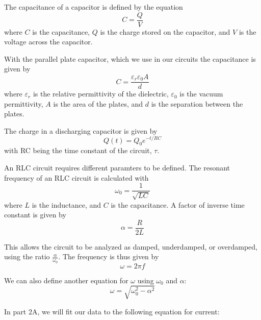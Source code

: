 \documentclass[11pt]{article}
\begin{document}
    The capacitance of a capacitor is defined by the equation
    \begin{equation}
        C = \frac{Q}{V}
    \end{equation}\label{eq:capacitance}
    where $C$ is the capacitance, $Q$ is the charge stored on the capacitor, and $V$ is the voltage across the capacitor.

    With the parallel plate capacitor, which we use in our circuits the capacitance is given by
    \begin{equation}
        C = \frac{\varepsilon_r \varepsilon_0 A}{d}
    \end{equation}\label{eq:parallel-plate-capacitance}
    where $\varepsilon_r$ is the relative permittivity of the dielectric, $\varepsilon_0$ is the vacuum permittivity, $A$ is the area of the plates, and $d$ is the separation between the plates.

    The charge in a discharging capacitor is given by
    \begin{equation}
        Q(t) = Q_0 e^{-t/RC}
    \end{equation}\label{eq:discharging-capacitor}
    with RC being the time constant of the circuit, $\tau$.

    An RLC circuit requires different paramters to be defined.
    The resonant frequency of an RLC circuit is calculated with
    \begin{equation}
        \omega_0 = \frac{1}{\sqrt{LC}}
    \end{equation}\label{eq:omega-0}
    where $L$ is the inductance, and $C$ is the capacitance.
    A factor of inverse time constant is given by
    \begin{equation}
        \alpha = \frac{R}{2L}
    \end{equation}\label{eq:alpha}

    This allows the circuit to be analyzed as damped, underdamped, or overdamped, using the ratio $\frac{\alpha}{\omega_0}$.
    The frequency is thus given by
    \begin{equation}
        \omega = 2\pi f
    \end{equation}\label{eq:frequency}

    We can also define another equation for ${\omega}$ using ${\omega_0}$ and ${\alpha}$:
    \begin{equation}
        \omega = \sqrt{\omega_0^2 - \alpha^2}
    \end{equation}\label{eq:omega}

    In part 2A, we will fit our data to the following equation for current:
\end{document}
